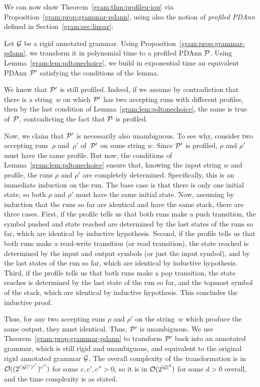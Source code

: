 %
%
%
%
%
%
%
%
%
%
%
%
%
%
%
We can now show Theorem~\ref{gram:thm:profileu-iou} via
Proposition~\ref{gram:prop:grammar-pdann}, using also the notion of \emph{profiled
PDAnn} defined in Section~\ref{gram:sec:linear}:

  Let $\mathcal{G}$ be a rigid annotated grammar. Using Proposition~\ref{gram:prop:grammar-pdann}, we
  transform it in polynomial time to a profiled PDAnn $\mathcal{P}$.
  Using Lemma~\ref{gram:lem:pdtonechoice}, we
  build in exponential time an equivalent PDAnn $\mathcal{P}'$ satisfying the conditions of the lemma.

  We know that $\mathcal{P}'$ is still profiled. Indeed, if we assume by
  contradiction that there is a string~$w$ on which $\mathcal{P}'$ has two accepting runs
  with different profiles, then by the last condition of
  Lemma~\ref{gram:lem:pdtonechoice}, the same is true of~$\mathcal{P}$, contradicting the
  fact that $\mathcal{P}$ is profiled.

  Now, we claim that $\mathcal{P}'$ is necessarily also unambiguous. To see why,
  consider two accepting runs~$\rho$ and~$\rho'$ of~$\mathcal{P}'$ on some string $w$. Since
  $\mathcal{P}'$ is profiled, $\rho$ and $\rho'$ must have the same
  profile. But now, the conditions of Lemma~\ref{gram:lem:pdtonechoice} ensure that,
  knowing the input string $w$ and profile, the runs $\rho$ and $\rho'$ are completely
  determined. Specifically, this is an immediate
  induction on the run. The base case is that there is only one initial state,
  so both $\rho$ and $\rho'$ must have the same initial state. Now, assuming by
  induction that the runs so far are identical and have the same stack, there
  are three cases. First, if the profile tells us that both runs make a push
  transition, the symbol pushed and state reached are determined by the last
  states of the runs so
  far, which are identical by inductive hypothesis. Second, if the profile tells us that both runs make
  a read-write transition (or read transition), the state reached is determined by the input and output
  symbols (or just the input symbol), and by the last states of the run so far, which are identical by
  inductive hypothesis. Third, if the profile tells
  us that both runs make a pop transition, the state reaches is determined by
  the last state of the run so far, and the topmost symbol of the stack, which
  are identical by inductive hypothesis. This concludes the inductive proof.

  Thus, for any two accepting runs $\rho$ and $\rho'$ on the string~$w$ which produce the same output, they must identical. Thus, $\mathcal{P}'$ is unambiguous.
  We use Theorem~\ref{gram:prop:grammar-pdann} to transform $\mathcal{P}'$ back into an
  annotated grammar, which is still rigid and unambiguous, and equivalent to the
  original rigid annotated grammar $\mathcal{G}$. The overall complexity of the
  transformation is in $\mathcal{O}((2^{(|\mathcal{G}|^c)^{c'}})^{c''})$ for some $c, c', c'' > 0$,
  so it is in $\mathcal{O}(2^{|\mathcal{G}|^d})$ for some $d>0$ overall, and the time complexity
  is as stated.

